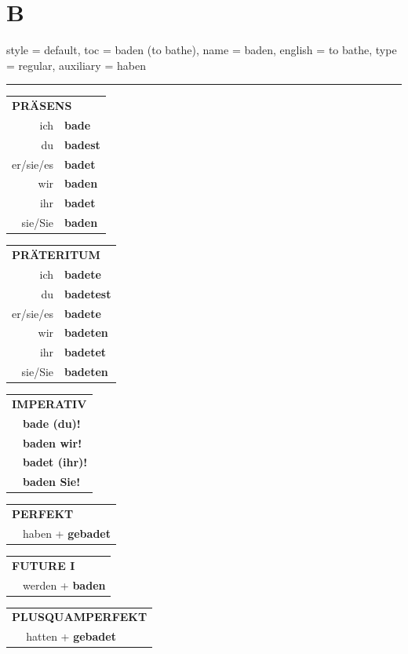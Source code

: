 \section{B}

\begin{verbentry}{
  style = {default},
  toc = {baden (to bathe)},
  name = {baden},
  english = {to bathe},
  type = {regular},
  auxiliary = {haben}
}


\vspace{5pt}
\hrule
\vspace{5pt}

\begin{tabular}{rl}
\multicolumn{2}{l}{\textbf{PRÄSENS}}\\
ich & \textbf{bade}\\
du & \textbf{badest}\\
er/sie/es & \textbf{badet}\\
wir & \textbf{baden}\\
ihr & \textbf{badet}\\
sie/Sie & \textbf{baden}\\
\end{tabular}
\hfill
\begin{tabular}{rl}
\multicolumn{2}{l}{\textbf{PRÄTERITUM}}\\
ich & \textbf{badete}\\
du & \textbf{badetest}\\
er/sie/es & \textbf{badete}\\
wir & \textbf{badeten}\\
ihr & \textbf{badetet}\\
sie/Sie & \textbf{badeten}\\
\end{tabular}
\hfill
\begin{tabular}{rl}
\multicolumn{2}{l}{\textbf{IMPERATIV}}\\
& \textbf{bade (du)!}\\
& \textbf{baden wir!}\\
& \textbf{badet (ihr)!}\\
& \textbf{baden Sie!}\\
\end{tabular}

\vspace{10pt}

\begin{tabular}{rl}
\multicolumn{2}{l}{\textbf{PERFEKT}}\\
& haben + \textbf{gebadet}\\
\end{tabular}
\hfill
\begin{tabular}{rl}
\multicolumn{2}{l}{\textbf{FUTURE I}}\\
& werden + \textbf{baden}\\
\end{tabular}
\hfill
\begin{tabular}{rl}
\multicolumn{2}{l}{\textbf{PLUSQUAMPERFEKT}}\\
& hatten + \textbf{gebadet}\\
\end{tabular}


\end{verbentry}
